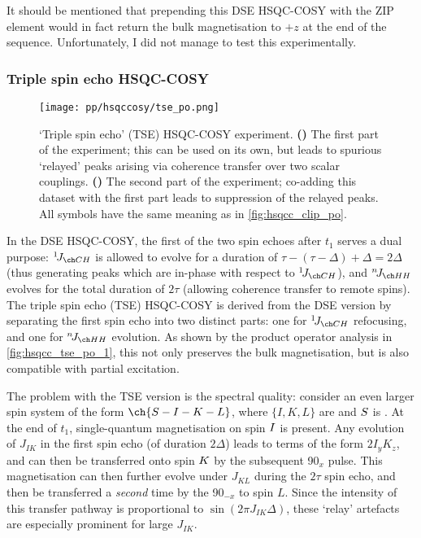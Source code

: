 It should be mentioned that prepending this DSE HSQC-COSY with the ZIP element would in fact return the bulk  magnetisation to $+z$ at the end of the sequence.
Unfortunately, I did not manage to test this experimentally.


\subsubsection{Triple spin echo HSQC-COSY}

\begin{figure}[!ht]
    \centering
    \texttt{[image: pp/hsqccosy/tse\_po.png]}%
    {\label{fig:hsqcc_tse_po_1}}%
    {\label{fig:hsqcc_tse_po_2}}%
    \caption[Triple spin echo HSQC-COSY experiment]{
        `Triple spin echo' (TSE) HSQC-COSY experiment.
        \textbf{()} The first part of the experiment; this can be used on its own, but leads to spurious `relayed' peaks arising via coherence transfer over two scalar couplings.
        \textbf{()} The second part of the experiment; co-adding this dataset with the first part leads to suppression of the relayed peaks.
        All symbols have the same meaning as in \cref{fig:hsqcc_clip_po}.
    }
    \label{fig:hsqcc_tse_po}
\end{figure}

In the DSE HSQC-COSY, the first of the two spin echoes after $t_1$ serves a dual purpose: $\oneJ{CH}$ is allowed to evolve for a duration of $\tau - (\tau - \Delta) + \Delta = 2\Delta$ (thus generating peaks which are in-phase with respect to $\oneJ{CH}$), and $\nJ{HH}$ evolves for the total duration of $2\tau$ (allowing coherence transfer to remote spins).
The triple spin echo (TSE) HSQC-COSY is derived from the DSE version by separating the first spin echo into two distinct parts: one for $\oneJ{CH}$ refocusing, and one for $\nJ{HH}$ evolution.
As shown by the product operator analysis in \cref{fig:hsqcc_tse_po_1}, this not only preserves the bulk  magnetisation, but is also compatible with partial  excitation.

The problem with the TSE version is the spectral quality: consider an even larger spin system of the form $\ch{S-I-K-L}$, where $\{I,K,L\}$ are \proton{} and $S\/$ is \carbon{}.
At the end of $t_1$, single-quantum magnetisation on spin $I\/$ is present.
Any evolution of $J_{IK}$ in the first spin echo (of duration $2\Delta$) leads to terms of the form $2I_yK_z$, and can then be transferred onto spin $K\/$ by the subsequent 90\rlap{\unit{\degree}}$_{x}$ pulse.
This magnetisation can then further evolve under $J_{KL}$ during the $2\tau$ spin echo, and then be transferred a \textit{second} time by the 90\rlap{\unit{\degree}}$_{-x}$ to spin $L$.
Since the intensity of this transfer pathway is proportional to $\sin(2\pi J_{IK}\Delta)$, these `relay' artefacts are especially prominent for large $J_{IK}$.

